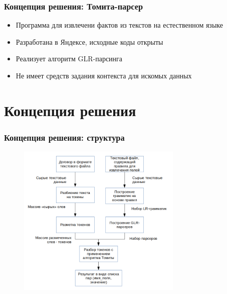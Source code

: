 \documentclass{beamer}
\begin{document}
\begin{frame}
\frametitle{Концепция решения: Томита-парсер}
\begin{itemize}
	\item Программа для извлечени фактов из текстов на естественном языке
	\item Разработана в Яндексе, исходные коды открыты
	\item Реализует алгоритм GLR-парсинга
	\item Не имеет средств задания контекста для искомых данных
\end{itemize}
\end{frame}

\section{Концепция решения}
\begin{frame}
\frametitle{Концепция решения: структура}
\begin{figure}%
\centering
\includegraphics[width=0.7\textwidth]{img/ProjectDiagramPres.png}
\end{figure}
\end{frame}

\end{document}
